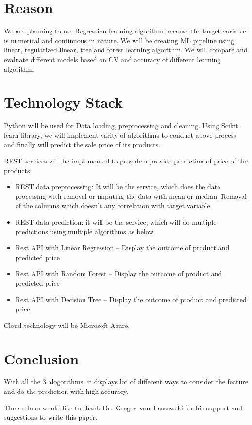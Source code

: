 \section{Reason}

We are planning to use Regression learning algorithm because the target variable is 
numerical and continuous in nature. We will be creating ML pipeline using linear, 
regularized linear, tree and forest learning algorithm. We will compare and evaluate 
different models based on CV and accuracy of different learning algorithm.

\section{Technology Stack}

Python will be used for Data loading, preprocessing and cleaning. Using Scikit learn 
library, we will implement varity of algorithms to conduct above process and finally 
will predict the sale price of its products.

REST services will be implemented to provide a provide prediction of price of the 
products:

\begin{itemize}
\item REST data preprocessing: It will be the service, which does the data processing 
with removal or imputing the data with mean or median. Removal of the columns which 
doesn’t any correlation with target variable
\item REST data prediction: it will be the service, which will do multiple predictions 
using multiple algorithms as below

\item Rest API with Linear Regression – Display the outcome of product and predicted 
price
\item Rest API with Random Forest – Display the outcome of product and predicted price
\item Rest API with Decision Tree – Display the outcome of product and predicted price
\end{itemize}

Cloud technology will be Microsoft Azure.

\section{Conclusion}

With all the 3 alogorithms, it displays lot of different ways to consider the feature
and do the prediction with high accuracy.


\begin{acks}

  The authors would like to thank Dr.~Gregor~von~Laszewski for his
  support and suggestions to write this paper.

\end{acks}


 


